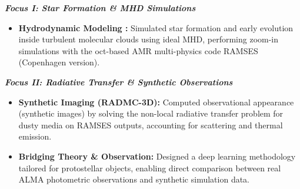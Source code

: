 \documentclass[11pt]{article}
\begin{document}
\vspace{3pt}
\noindent\textit{\textbf{Focus I: Star Formation \& MHD Simulations}}
\begin{itemize}[noitemsep, topsep=2pt, partopsep=0pt, parsep=2pt, leftmargin=1.5em]
    \item \textbf{Hydrodynamic Modeling :} Simulated star formation and early evolution inside turbulent molecular clouds using ideal MHD, performing zoom-in simulations with the oct-based AMR multi-physics code RAMSES (Copenhagen version).
\end{itemize}

\vspace{3pt}
\noindent\textit{\textbf{Focus II: Radiative Transfer \& Synthetic Observations}}
\begin{itemize}[noitemsep, topsep=2pt, partopsep=0pt, parsep=2pt, leftmargin=1.5em]
    \item \textbf{Synthetic Imaging (RADMC-3D):} Computed observational appearance (synthetic images) by solving the non-local radiative transfer problem for dusty media on RAMSES outputs, accounting for scattering and thermal emission.
    \item \textbf{Bridging Theory \& Observation:} Designed a deep learning methodology tailored for protostellar objects, enabling direct comparison between real ALMA photometric observations and synthetic simulation data.
\end{itemize}
\end{document}
